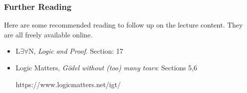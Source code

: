 \documentclass{beamer}
\begin{document}
\begin{frame}
	\frametitle{Further Reading}
	
	Here are some recommended reading to follow up on the lecture content. They are all freely available online. 
	
	\vspace{0.5cm}
	
	\begin{itemize}
		\item L$\exists \forall$N, \emph{Logic and Proof}. Section: 17 
		\item Logic Matters, \emph{G\"{o}del without (too) many tears}: Sections 5,6
		
		\quad \quad https://www.logicmatters.net/igt/
	\end{itemize}
	
\end{frame}
\end{document}
